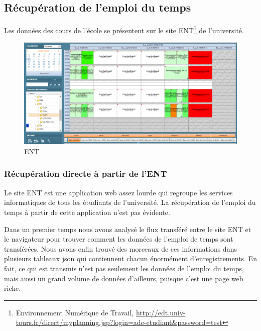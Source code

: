 \documentclass[twoside]{EPURapport}
\begin{document}
\subsection{Récupération de l'emploi du temps}
Les données des cours de l'école se présentent sur le site ENT\footnote{Environnement Numérique de Travail, \url{http://edt.univ-tours.fr/direct/myplanning.jsp?login=ade-etudiant&password=test}} de l'université. 

\begin{figure}[!htbp]
	\centering
		\includegraphics[scale=0.5]{img/ent.png}
	\caption{ENT}
	\label{fig:ent} 
\end{figure}
\bigskip

\subsubsection{Récupération directe à partir de l'ENT} %
Le site ENT est une application web assez lourde qui regroupe les services informatiques de tous les étudiants de l'université. La récupération de l'emploi du temps à partir de cette application n'est pas évidente.


Dans un premier temps nous avons analysé le flux transféré entre le site ENT et le navigateur pour trouver comment les données de l'emploi de temps sont transférées. Nous avons enfin trouvé des morceaux de ces informations dans plusieurs tableaux json qui contiennent chacun énormément d'enregistrements. En fait, ce qui est transmis n'est pas seulement les données de l'emploi du temps, mais aussi un grand volume de données d'ailleurs, puisque c'est une page web riche.
\end{document}
